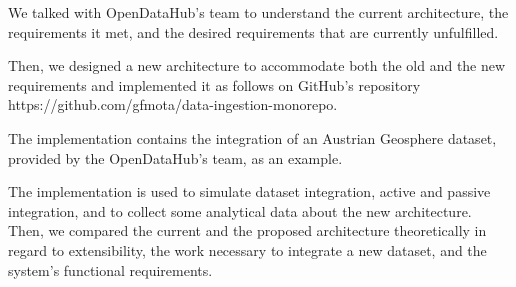 We talked with OpenDataHub's team to understand the current architecture, the requirements it met, and the desired requirements that are currently unfulfilled. 

Then, we designed a new architecture to accommodate both the old and the new requirements and implemented it as follows on GitHub's repository https://github.com/gfmota/data-ingestion-monorepo.

The implementation contains the integration of an Austrian Geosphere dataset, provided by the OpenDataHub's team, as an example.

The implementation is used to simulate dataset integration, active and passive integration, and to collect some analytical data about the new architecture. Then, we compared the current and the proposed architecture theoretically in regard to extensibility, the work necessary to integrate a new dataset, and the system's functional requirements.
